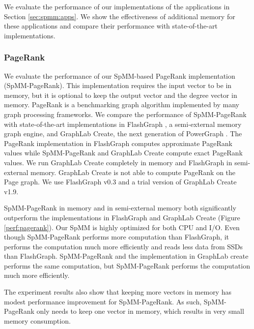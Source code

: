 We evaluate the performance of our implementations of the applications in
Section \ref{sec:spmm:apps}. We show the effectiveness of additional memory for
these applications and compare their performance with state-of-the-art
implementations.

\subsubsection{PageRank}
We evaluate the performance of our SpMM-based PageRank implementation
(SpMM-PageRank). This implementation requires the input vector to be in memory,
but it is optional to keep the output vector and the degree vector in memory.
PageRank is a benchmarking graph algorithm implemented by many graph processing
frameworks. We compare the performance of SpMM-PageRank with state-of-the-art
implementations in FlashGraph \cite{FlashGraph}, a semi-external memory graph
engine, and GraphLab Create, the next generation of PowerGraph \cite{powergraph}.
The PageRank implementation in FlashGraph computes
approximate PageRank values while SpMM-PageRank and GraphLab Create compute
exact PageRank values. We run GraphLab Create completely in memory and
FlashGraph in semi-external memory. GraphLab Create is not able to compute
PageRank on the Page graph. We use FlashGraph v0.3 and a trial version of
GraphLab Create v1.9.

SpMM-PageRank in memory and in semi-external memory both significantly outperform
the implementations in FlashGraph and GraphLab Create (Figure \ref{perf:pagerank}).
Our SpMM is highly optimized for both CPU
and I/O. Even though SpMM-PageRank performs more computation than FlashGraph,
it performs the computation much more efficiently and
reads less data from SSDs than FlashGraph. SpMM-PageRank and the implementation
in GraphLab create performs the same computation, but SpMM-PageRank
performs the computation much more efficiently.

The experiment results also show that keeping more vectors in memory has modest
performance improvement for SpMM-PageRank. As such, SpMM-PageRank only needs
to keep one vector in memory, which results in very small memory consumption.

